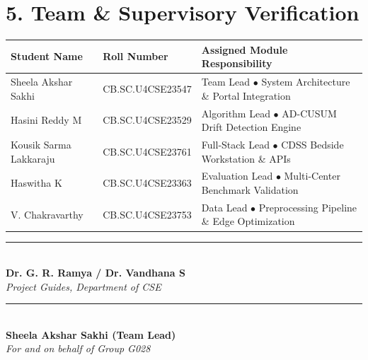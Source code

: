 \documentclass[11pt, a4paper]{article}
\begin{document}
\vspace{0.4cm}

\section*{5. Team \& Supervisory Verification}
\begin{center}
\renewcommand{\arraystretch}{1.2}
\begin{tabular}{|l|l|l|}
\hline
\textbf{Student Name} & \textbf{Roll Number} & \textbf{Assigned Module Responsibility} \\
\hline
Sheela Akshar Sakhi & CB.SC.U4CSE23547 & Team Lead $\bullet$ System Architecture \& Portal Integration \\
Hasini Reddy M & CB.SC.U4CSE23529 & Algorithm Lead $\bullet$ AD-CUSUM Drift Detection Engine \\
Kousik Sarma Lakkaraju & CB.SC.U4CSE23761 & Full-Stack Lead $\bullet$ CDSS Bedside Workstation \& APIs \\
Haswitha K & CB.SC.U4CSE23363 & Evaluation Lead $\bullet$ Multi-Center Benchmark Validation \\
V. Chakravarthy & CB.SC.U4CSE23753 & Data Lead $\bullet$ Preprocessing Pipeline \& Edge Optimization \\
\hline
\end{tabular}
\end{center}

\vspace{0.6cm}

\noindent
\begin{minipage}{0.48\textwidth}
\centering
\rule{6cm}{0.4pt}\\
\textbf{Dr. G. R. Ramya / Dr. Vandhana S}\\
\textit{Project Guides, Department of CSE}
\end{minipage}
\hfill
\begin{minipage}{0.48\textwidth}
\centering
\rule{6cm}{0.4pt}\\
\textbf{Sheela Akshar Sakhi (Team Lead)}\\
\textit{For and on behalf of Group G028}
\end{minipage}
\end{document}
